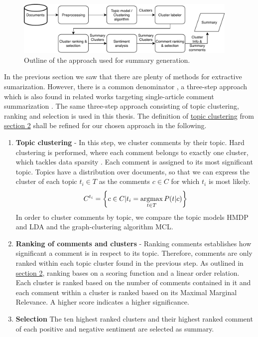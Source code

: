 \begin{figure}[h]%
\label{fig11}%
\centering
\includegraphics[width=0.95\textwidth]{img/overall_approach1.pdf}
\caption{Outline of the approach used for summary generation.}%
\end{figure}
In the previous section we saw that there are plenty of methods for extractive sumarization. However, there is a common denominator \cite{DBLP:books/sp/mining2012/NenkovaM12}, a three-step approach which is also found in related works targeting single-article comment summarization \cite{DBLP:conf/cikm/MaSYC12, llewellyn_grover_oberlander, DBLP:conf/ecir/FunkABPHG17}.
The same three-step approach consisting of topic clustering, ranking and selection is used in this thesis. The definition of \hyperref[tcdef]{topic clustering} from \hyperref[background]{section 2} shall be refined for our chosen approach in the following.
\begin{enumerate}
\item \textbf{Topic clustering} - In this step, we cluster comments by their topic. Hard clustering is performed, where each comment belongs to exactly one cluster, which tackles data sparsity \cite{DBLP:journals/tacl/NguyenBDJ15}. Each comment is assigned to its most significant topic. Topics have a distribution over documents, so that we can express the cluster of each topic $t_i \in T$ as the comments $c \in C$ for which $t_i$ is most likely.
\begin{equation}
C^{t_i} = \left\{c \in C| t_i = \operatorname*{argmax}_{t \in T} P(t|c)\right\}
\end{equation}
In order to cluster comments by topic, we compare the topic models HMDP and LDA and the graph-clustering algorithm MCL.
\item \textbf{Ranking of comments and clusters} - Ranking comments establishes how significant a comment is in respect to its topic. Therefore, comments are only ranked within each topic cluster found in the previous step.
As outlined in \hyperref[rankingdef]{section 2}, ranking bases on a scoring function and a linear order relation. Each cluster is ranked based on the number of comments contained in it and each comment within a cluster is ranked based on its Maximal Marginal Relevance. A higher score indicates a higher significance.
\item \textbf{Selection} The ten highest ranked clusters and their highest ranked comment of each positive and negative sentiment are selected as summary.
\end{enumerate} 
